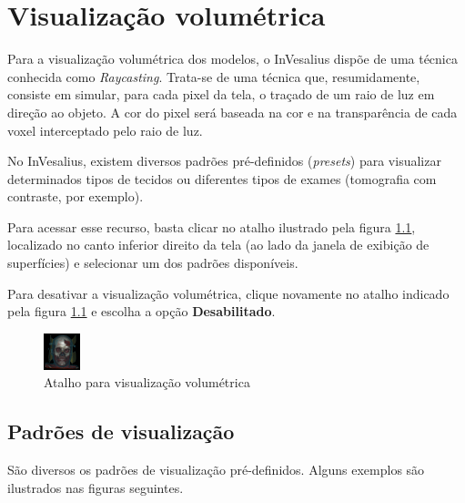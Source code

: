 \chapter{Visualização volumétrica}
\label{cap:vis_vol}

Para a visualização volumétrica dos modelos, o InVesalius dispõe de uma técnica
conhecida como \textit{Raycasting}. Trata-se de uma técnica que,
resumidamente, consiste em simular, para cada pixel da tela, o traçado de um raio de luz em
direção ao objeto. A cor do pixel será baseada na cor e na transparência de cada voxel
interceptado pelo raio de luz.

No InVesalius, existem diversos padrões pré-definidos (\textit{presets}) para visualizar
determinados tipos de tecidos ou diferentes tipos de exames (tomografia com contraste, por
exemplo).

Para acessar esse recurso, basta clicar no atalho ilustrado pela figura
\ref{fig:volume_raycasting_origina}, localizado no canto inferior direito da tela (ao lado da
janela de exibição de superfícies) e selecionar um dos padrões disponíveis.

Para desativar a visualização volumétrica, clique novamente no atalho indicado pela figura
\ref{fig:volume_raycasting_origina} e escolha a opção \textbf{Desabilitado}.

\begin{figure}[!htb]
\centering
\includegraphics[scale=0.4]{../user_guide_figures/icons/volume_raycasting_origina.png}
\caption{Atalho para visualização volumétrica}
\label{fig:volume_raycasting_origina}
\end{figure}

\section{Padrões de visualização}

São diversos os padrões de visualização pré-definidos. Alguns exemplos são ilustrados nas
figuras seguintes.


